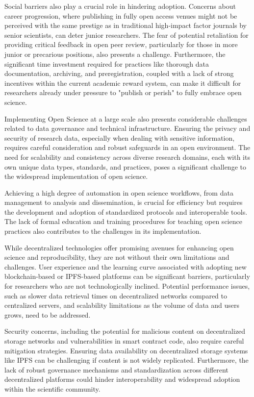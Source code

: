 Social barriers also play a crucial role in hindering adoption. Concerns about career progression, where publishing in fully open access venues might not be perceived with the same prestige as in traditional high-impact factor journals by senior scientists, can deter junior researchers. The fear of potential retaliation for providing critical feedback in open peer review, particularly for those in more junior or precarious positions, also presents a challenge. Furthermore, the significant time investment required for practices like thorough data documentation, archiving, and preregistration, coupled with a lack of strong incentives within the current academic reward system, can make it difficult for researchers already under pressure to "publish or perish" to fully embrace open science.

Implementing Open Science at a large scale also presents considerable challenges related to data governance and technical infrastructure. Ensuring the privacy and security of research data, especially when dealing with sensitive information, requires careful consideration and robust safeguards in an open environment. The need for scalability and consistency across diverse research domains, each with its own unique data types, standards, and practices, poses a significant challenge to the widespread implementation of open science.

Achieving a high degree of automation in open science workflows, from data management to analysis and dissemination, is crucial for efficiency but requires the development and adoption of standardized protocols and interoperable tools. The lack of formal education and training procedures for teaching open science practices also contributes to the challenges in its implementation.

While decentralized technologies offer promising avenues for enhancing open science and reproducibility, they are not without their own limitations and challenges. User experience and the learning curve associated with adopting new blockchain-based or IPFS-based platforms can be significant barriers, particularly for researchers who are not technologically inclined. Potential performance issues, such as slower data retrieval times on decentralized networks compared to centralized servers, and scalability limitations as the volume of data and users grows, need to be addressed.

Security concerns, including the potential for malicious content on decentralized storage networks and vulnerabilities in smart contract code, also require careful mitigation strategies. Ensuring data availability on decentralized storage systems like IPFS can be challenging if content is not widely replicated. Furthermore, the lack of robust governance mechanisms and standardization across different decentralized platforms could hinder interoperability and widespread adoption within the scientific community.

